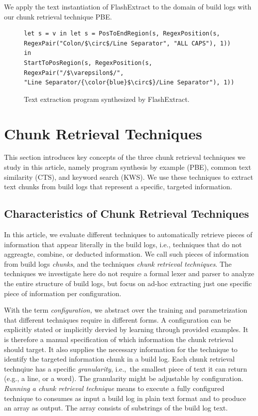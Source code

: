 We apply the text instantiation of FlashExtract to the domain of build
logs with our chunk retrieval technique PBE\@.

\begin{figure}[!t]
  \centering
  \begin{lstlisting}[breaklines=true]
let s = v in let s = PosToEndRegion(s, RegexPosition(s,
RegexPair("Colon/$\circ$/Line Separator", "ALL CAPS"), 1)) in
StartToPosRegion(s, RegexPosition(s, RegexPair("/$\varepsilon$/",
"Line Separator/{\color{blue}$\circ$}/Line Separator"), 1))
  \end{lstlisting}
  \caption{Text extraction program synthesized by FlashExtract.}
  \label{lst:prose-program}
\end{figure}

\section{Chunk Retrieval Techniques}
\label{sec:techniques}
This section introduces key concepts of the three chunk retrieval
techniques we study in this article, namely program synthesis by
example (PBE), common text similarity (CTS), and keyword search (KWS).
We use these techniques to extract text chunks from build logs that
represent a specific, targeted information.

\subsection{Characteristics of Chunk Retrieval Techniques}
\label{sec:blirt}
In this article, we evaluate different techniques to automatically
retrieve pieces of information that appear literally in the build
logs, i.e., techniques that do not aggreagte, combine, or deducted
information.
We call such pieces of information from build logs
\emph{chunks}, and the techniques \emph{chunk retrieval techniques}.
The techniques we investigate here do not require a formal lexer and
parser to analyze the entire structure of build logs, but focus on
ad-hoc extracting just one specific piece of information per
configuration.

With the term \textit{configuration,} we abstract over the training
and parametrization that different techniques require in different
forms.
A configuration can be explicitly stated or implicitly dervied
by learning through provided examples.
It is therefore a manual
specification of which information the chunk retrieval should target.
It also supplies the necessary information for the technique to
identify the targeted information chunk in a build log.
Each chunk
retrieval technqiue has a specific \textit{granularity}, i.e.,\ the
smallest piece of text it can return (e.g., a line, or a word).
The
granularity might be adjustable by configuration.
\emph{Running a
chunk retrieval technique} means to execute a fully configured
technique to consumes as input a build log in plain text format and to
produce an array as output.
The array consists of substrings of the
build log text.

